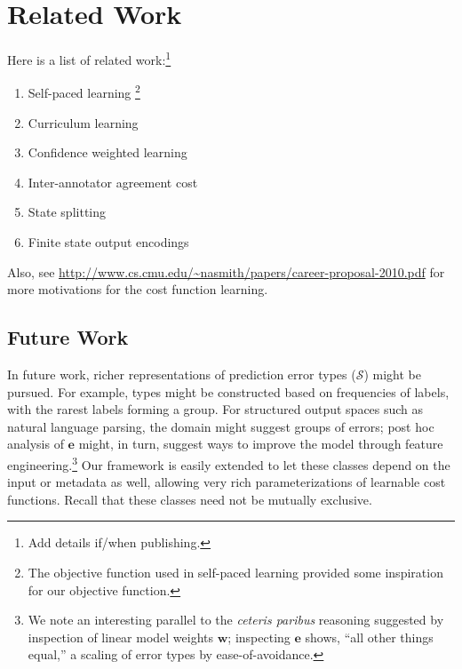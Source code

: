\documentclass{article} %
\begin{document}
\section{Related Work}

Here is a list of related work:\footnote{Add details if/when
publishing.}

\begin{enumerate}

\item Self-paced learning \citep{kumar2010self}\footnote{The
objective function used in self-paced learning provided 
some inspiration
for our objective function.}

\item Curriculum learning \citep{bengio2009curriculum}

\item Confidence weighted learning \citep{dredze2008confidence}

\item Inter-annotator agreement cost \citep{plank2014learning}

\item State splitting  \citep{petrov2011coarse}

\item Finite state output encodings \citep{loper2008encoding}

\end{enumerate}

Also, see \url{http://www.cs.cmu.edu/~nasmith/papers/career-proposal-2010.pdf} for more motivations for the cost function
learning.

\subsection{Future Work}

In future work, richer representations of prediction error types
($\mathcal{S}$) might be pursued.  For example, types might be 
constructed based on frequencies of labels, with the rarest labels forming
a group.  For structured output spaces such as natural language
parsing, the domain might suggest
groups of errors; post hoc analysis of $\mathbf{e}$ might, in turn,
suggest ways to improve the model through feature
engineering.\footnote{We note an interesting parallel to the
  \emph{ceteris paribus} reasoning suggested by inspection of
linear model weights $\mathbf{w}$; inspecting $\mathbf{e}$ shows,
``all other things equal,'' a scaling of error types by ease-of-avoidance.}
Our framework is easily extended to let these classes depend on
the input or metadata as well, allowing very rich parameterizations of
learnable cost functions.  Recall that these classes need not be mutually exclusive.
\end{document}
